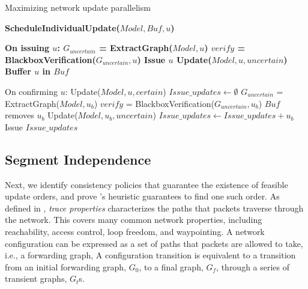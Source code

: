 \begin{algorithm}[t]
  \small
\caption{Maximizing network update parallelism}
\bf{ScheduleIndividualUpdate}($Model, Buf, u$)
\begin{algorithmic} 
\State \bf{On issuing $u$:}
\State $G_{uncertain}$ = ExtractGraph($Model, u$)
\State $verify$ = BlackboxVerification($G_{uncertain}, u$)
        \State Issue $u$
        \State Update($Model, u, uncertain$)
\Else
        \State Buffer $u$ in $Buf$
\EndIf

\State
\State On confirming $u$:
\State Update($Model, u, certain$)
\State $Issue\_updates \gets \emptyset$
                \State $G_{uncertain}$ = ExtractGraph($Model, u_b$)
                \State $verify$ = BlackboxVerification($G_{uncertain}, u_b$)
                        \State $Buf$ removes $u_b$
                        \State Update($Model, u_b, uncertain$)
                        \State $Issue\_updates \gets Issue\_updates + u_b$
                \EndIf
\EndFor
\State Issue $Issue\_updates$
\label{alg:blackbox}
\end{algorithmic}  
\end{algorithm}

\subsection{Segment Independence}
\label{sec:seg-independence}

Next, we identify consistency policies that guarantee
the existence of feasible update orders, 
and prove \name's heuristic guarantees to find one such order.
As defined in \cite{Reitblatt2012}, {\em trace properties} characterizes
the paths that packets traverse through the network.  This covers many common network properties, including reachability, access control, loop freedom, and waypointing.
A network configuration can be expressed as a set of paths that packets are allowed to take,
i.e., a forwarding graph, 
A configuration transition is equivalent to a transition from an initial forwarding graph, $G_0$,
to a final graph, $G_f$, through a series of transient graphs, $G_t$s. 

